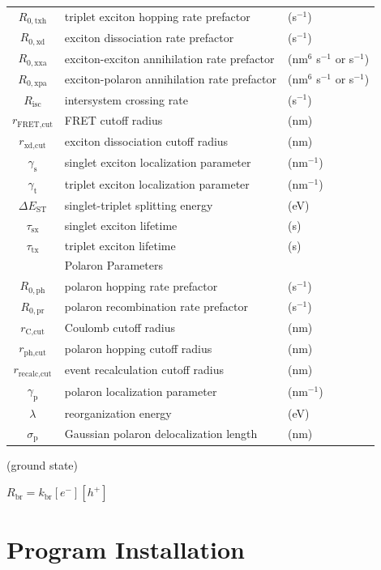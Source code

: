 \documentclass[%
 reprint,onecolumn,notitlepage,
superscriptaddress,longbibliography,
 amsmath,amssymb,
 aps,rmp,floatfix,
]{revtex4-1}
\begin{document}
\begin{center}
\begin{tabular}{ c l l }
$R_{0,\text{txh}}$ & triplet exciton hopping rate prefactor & (s$^{-1}$) \\
$R_{0,\text{xd}}$ & exciton dissociation rate prefactor & (s$^{-1}$) \\
$R_{0,\text{xxa}}$ & exciton-exciton annihilation rate prefactor & (nm$^{6}$ s$^{-1}$ or s$^{-1}$) \\
$R_{0,\text{xpa}}$ & exciton-polaron annihilation rate prefactor & (nm$^{6}$ s$^{-1}$ or s$^{-1}$) \\ 
$R_{\text{isc}}$ & intersystem crossing rate & (s$^{-1}$) \\
$r_{\text{FRET,cut}}$ & FRET cutoff radius & (nm) \\
$r_{\text{xd,cut}}$ & exciton dissociation cutoff radius & (nm) \\
$\gamma_\text{s}$ & singlet exciton localization parameter & (nm$^{-1}$) \\
$\gamma_\text{t}$ & triplet exciton localization parameter & (nm$^{-1}$) \\
$\Delta E_\text{ST}$ & singlet-triplet splitting energy & (eV) \\
$\tau_\text{sx}$ & singlet exciton lifetime & (s) \\
$\tau_\text{tx}$ & triplet exciton lifetime & (s) \\
\hline
 & Polaron Parameters & \\
 \hline
 $R_{0,\text{ph}}$ & polaron hopping rate prefactor & (s$^{-1}$) \\
$R_{0,\text{pr}}$ & polaron recombination rate prefactor & (s$^{-1}$) \\
$r_{\text{C,cut}}$ & Coulomb cutoff radius & (nm) \\
$r_{\text{ph,cut}}$ & polaron hopping cutoff radius & (nm) \\
$r_{\text{recalc,cut}}$ & event recalculation cutoff radius & (nm) \\
$\gamma_\text{p}$ & polaron localization parameter & (nm$^{-1}$) \\
$\lambda$ & reorganization energy & (eV) \\
$\sigma_\text{p}$ & Gaussian polaron delocalization
length & (nm) \\

\end{tabular}
\end{center}

(ground state)


$R_\text{br} = k_\text{br}[e^-][h^+]$

\section{Program Installation}
\end{document}
